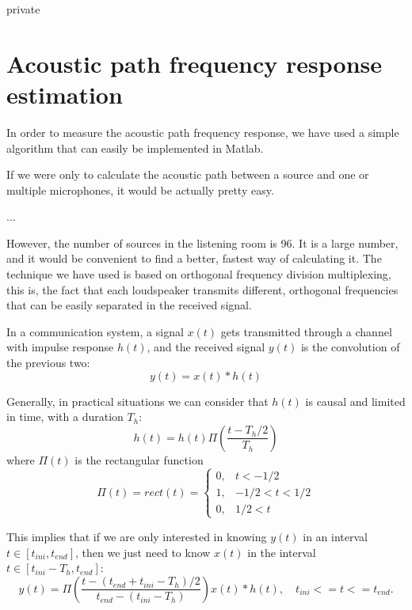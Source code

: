 \begin{shownto}{private}
\section{Acoustic path frequency response estimation}
In order to measure the acoustic path frequency response, we have used a simple algorithm that can easily be implemented in Matlab.

If we were only to calculate the acoustic path between a source and one or multiple microphones, it would be actually pretty easy.

...

However, the number of sources in the listening room is 96. It is a large number, and it would be convenient to find a better, fastest way of calculating it. The technique we have used is based on orthogonal frequency division multiplexing, this is, the fact that each loudspeaker transmits different, orthogonal frequencies that can be easily separated in the received signal.

In a communication system, a signal $x(t)$ gets transmitted through a channel with impulse response $h(t)$, and the received signal $y(t)$ is the convolution of the previous two:
\begin{equation}
y(t) = x(t)\ast h(t)
\end{equation}

Generally, in practical situations we can consider that $h(t)$ is causal and limited in time, with a duration $T_h$:
\begin{equation}
h(t) = h(t) \Pi\left(\frac{t - T_h/2}{T_h}\right)
\end{equation}
where $\Pi(t)$ is the rectangular function
\begin{equation}
\Pi(t) = \mathit{rect}(t) = \begin{cases}
0, & t < -1/2 \\
1, & -1/2 < t < 1/2 \\
0, & 1/2 < t
\end{cases}
\end{equation}

This implies that if we are only interested in knowing $y(t)$ in an interval $t \in [t_\mathit{ini}, t_\mathit{end}]$, then we just need to know $x(t)$ in the interval $t \in [t_\mathit{ini} - T_h, t_\mathit{end}]$:
\begin{equation}
y(t) = \Pi\left(\frac{t - (t_\mathit{end} + t_\mathit{ini} - T_h)/2}{t_\mathit{end} - (t_\mathit{ini} - T_h)}\right) x(t) \ast h(t), \quad t_\mathit{ini} <= t <= t_\mathit{end}.
\end{equation}


\end{shownto}
